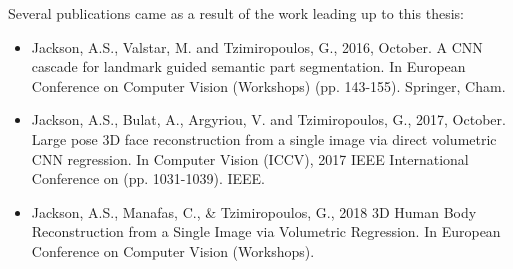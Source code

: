 \begin{publications}
  Several publications came as a result of the work leading up to this
  thesis:

  \begin{itemize}
  \item Jackson, A.S., Valstar, M. and Tzimiropoulos, G., 2016,
    October. A CNN cascade for landmark guided semantic part
    segmentation. In European Conference on Computer Vision (Workshops)
    (pp. 143-155). Springer, Cham.

  \item Jackson, A.S., Bulat, A., Argyriou, V. and Tzimiropoulos, G.,
    2017, October. Large pose 3D face reconstruction from a single
    image via direct volumetric CNN regression. In Computer Vision
    (ICCV), 2017 IEEE International Conference on
    (pp. 1031-1039). IEEE.

  \item Jackson, A.S., Manafas, C., \& Tzimiropoulos, G., 2018 3D
    Human Body Reconstruction from a Single Image via Volumetric
    Regression. In European Conference on Computer Vision (Workshops).
  \end{itemize}
\end{publications}


